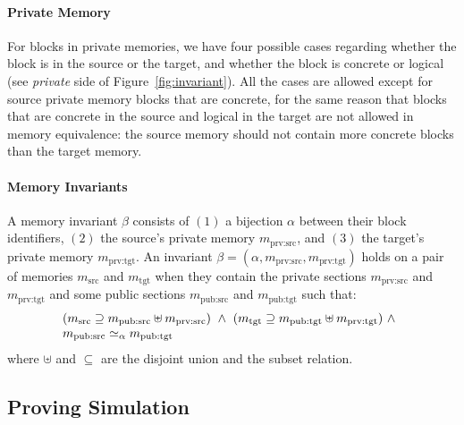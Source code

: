 \paragraph{Private Memory}
For blocks in private memories, we have four possible cases
regarding whether the block is in the source or the target, and
whether the block is concrete or logical (see \emph{private} side of
Figure~\ref{fig:invariant}).  All the cases are allowed except for
source private memory blocks that are concrete, for the same reason
that blocks that are concrete in the source and logical in the target are not
allowed in memory equivalence: the source memory should not contain
more concrete blocks than the target memory.

\paragraph{Memory Invariants}
A memory invariant $\beta$ consists of $(1)$ a bijection $\alpha$ between their
block identifiers, $(2)$ the source's private memory
$m_\textrm{prv:src}$, and $(3)$ the target's private memory
$m_\textrm{prv:tgt}$. 
An invariant $\beta=(\alpha, m_\textrm{prv:src}, m_\textrm{prv:tgt})$ 
holds on a pair of memories $m_{\textrm{src}}$ and
$m_{\textrm{tgt}}$ when they contain the private sections $m_\textrm{prv:src}$ and 
$m_\textrm{prv:tgt}$
and some public sections $m_\textrm{pub:src}$ and
$m_\textrm{pub:tgt}$ such that:
  \[\begin{array}{@{}l}
    (m_{\textrm{src}} \supseteq m_\textrm{pub:src} \uplus m_\textrm{prv:src})~\land~
    (m_{\textrm{tgt}} \supseteq m_\textrm{pub:tgt} \uplus m_\textrm{prv:tgt})~\land\\m_{\textrm{pub:src}} \simeq_\alpha m_{\textrm{pub:tgt}}
  \end{array}\]
  where 
$\uplus$ and $\subseteq$ are the disjoint union and the subset relation.

\subsection{Proving Simulation}
\label{reasoning:simulation}

